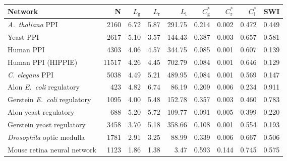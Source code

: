 \begin{tabular}{lrrrrrrrr}
\hline
Network & N  & $L_{\mathrm{g}}$ & $L_{\mathrm{r}}$ & $L_{\mathrm{l}}$ & $C^\ast_{\mathrm{g}}$ & $C^\ast_{\mathrm{r}}$ & $C^\ast_{\mathrm{l}}$ &  SWI \\
\hline
\textit{A.~thaliana} PPI & 2160 & 6.72 & 5.87 & 291.75 & 0.214 & 0.002 & 0.472 & 0.449\\
Yeast PPI & 2617 & 5.10 & 3.57 & 144.43 & 0.387 & 0.003 & 0.657 & 0.581\\
Human PPI & 4303 & 4.06 & 4.57 & 344.75 & 0.085 & 0.001 & 0.607 & 0.139\\
Human PPI (HIPPIE) & 11517 & 4.26 & 4.45 & 702.79 & 0.084 & 0.001 & 0.646 & 0.129\\
\textit{C. elegans} PPI & 5038 & 4.49 & 5.21 & 489.95 & 0.084 & 0.001 & 0.569 & 0.147\\
Alon \textit{E.~coli} regulatory & 423 & 4.82 & 6.74 & 86.19 & 0.209 & 0.006 & 0.234 & 0.911\\
Gerstein \textit{E.~coli} regulatory & 1095 & 4.00 & 5.48 & 152.78 & 0.357 & 0.003 & 0.460 & 0.783\\
Alon yeast regulatory & 688 & 5.20 & 5.72 & 109.77 & 0.091 & 0.005 & 0.399 & 0.220\\
Gerstein yeast regulatory & 3458 & 3.70 & 5.18 & 358.66 & 0.108 & 0.001 & 0.554 & 0.193\\
\textit{Drosophila} optic medulla & 1781 & 2.91 & 3.25 & 88.99 & 0.339 & 0.006 & 0.667 & 0.506\\
Mouse retina neural network & 1123 & 1.86 & 1.38 & 3.47 & 0.593 & 0.144 & 0.745 & 0.575\\
\hline
\end{tabular}
